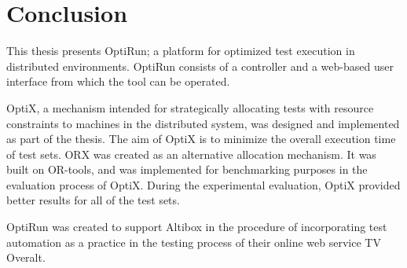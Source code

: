 \section{Conclusion}\label{chapters.conclusion}
\thispagestyle{plain}

This thesis presents OptiRun; a platform for optimized test execution in
distributed environments. OptiRun consists of a controller and a web-based user
interface from which the tool can be operated.

OptiX, a mechanism intended for strategically allocating tests with resource
constraints to machines in the distributed system, was designed and
implemented as part of the thesis. The aim of OptiX is to minimize the overall
execution time of test sets. ORX was created as an alternative allocation
mechanism. It was built on OR-tools, and was implemented for benchmarking
purposes in the evaluation process of OptiX. During the experimental evaluation,
OptiX provided better results for all of the test sets.

OptiRun was created to support Altibox in the procedure of incorporating test
automation as a practice in the testing process of their online web service TV
Overalt.

\vspace{0.6cm}

